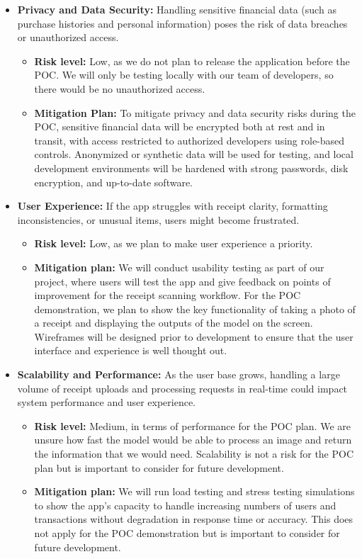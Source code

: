 \documentclass{article}
\begin{document}
\begin{itemize}
    \item \textbf{Privacy and Data Security:} Handling sensitive financial data (such as purchase histories and personal information) poses the risk of data breaches or unauthorized access.
    \begin{itemize}
        \item \textbf{Risk level:} Low, as we do not plan to release the application before the POC. We will only be testing locally with our team of developers, so there would be no unauthorized access.
         \item \textbf{Mitigation Plan:} To mitigate privacy and data security risks during the POC, sensitive financial data will be encrypted both at rest and in transit, with access restricted to authorized developers using role-based controls. Anonymized or synthetic data will be used for testing, and local development environments will be hardened with strong passwords, disk encryption, and up-to-date software. 
    \end{itemize}

    \item \textbf{User Experience:} If the app struggles with receipt clarity, formatting inconsistencies, or unusual items, users might become frustrated.
    \begin{itemize}
        \item \textbf{Risk level:} Low, as we plan to make user experience a priority.
        \item \textbf{Mitigation plan:} We will conduct usability testing as part of our project, where users will test the app and give feedback on points of improvement for the receipt scanning workflow. For the POC demonstration, we plan to show the key functionality of taking a photo of a receipt and displaying the outputs of the model on the screen. Wireframes will be designed prior to development to ensure that the user interface and experience is well thought out.
    \end{itemize}
    
    \item \textbf{Scalability and Performance:} As the user base grows, handling a large volume of receipt uploads and processing requests in real-time could impact system performance and user experience.
    \begin{itemize}
        \item \textbf{Risk level:} Medium, in terms of performance for the POC plan. We are unsure how fast the model would be able to process an image and return the information that we would need. Scalability is not a risk for the POC plan but is important to consider for future development.
        \item \textbf{Mitigation plan:} We will run load testing and stress testing simulations to show the app’s capacity to handle increasing numbers of users and transactions without degradation in response time or accuracy. This does not apply for the POC demonstration but is important to consider for future development.
    \end{itemize}
\end{itemize}
\end{document}
